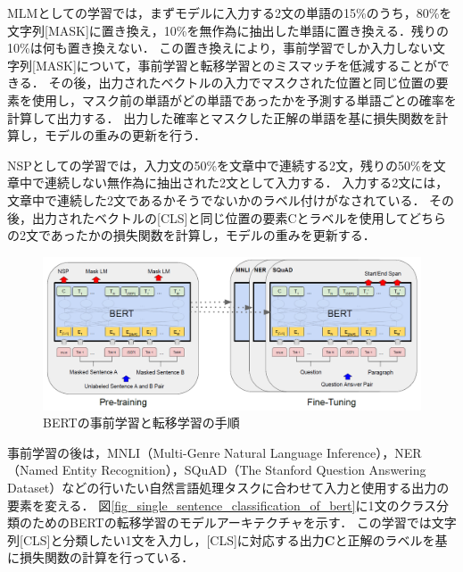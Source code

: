 \documentclass[12pt,a4j,dvipdfmx]{jreport}
\begin{document}
MLMとしての学習では，まずモデルに入力する2文の単語の15\%のうち，80\%を文字列[MASK]に置き換え，10\%を無作為に抽出した単語に置き換える．残りの10\%は何も置き換えない．
この置き換えにより，事前学習でしか入力しない文字列[MASK]について，事前学習と転移学習とのミスマッチを低減することができる．
その後，出力されたベクトルの入力でマスクされた位置と同じ位置の要素を使用し，マスク前の単語がどの単語であったかを予測する単語ごとの確率を計算して出力する．
出力した確率とマスクした正解の単語を基に損失関数を計算し，モデルの重みの更新を行う．

NSPとしての学習では，入力文の50\%を文章中で連続する2文，残りの50\%を文章中で連続しない無作為に抽出された2文として入力する．
入力する2文には，文章中で連続した2文であるかそうでないかのラベル付けがなされている．
その後，出力されたベクトルの[CLS]と同じ位置の要素Cとラベルを使用してどちらの2文であったかの損失関数を計算し，モデルの重みを更新する．

\begin{figure}[H]
	\centering
	\includegraphics[keepaspectratio, width=120mm]{img/fine-tuning-of-bert.png}
	\caption{BERTの事前学習と転移学習の手順\protect\footnotemark[5]}
	\label{fig_fine_tuning_of_bert}
\end{figure}

事前学習の後は，MNLI（Multi-Genre Natural Language Inference），NER（Named Entity Recognition），SQuAD（The Stanford Question Answering Dataset）などの行いたい自然言語処理タスクに合わせて入力と使用する出力の要素を変える．
図\ref{fig_single_sentence_classification_of_bert}に1文のクラス分類のためのBERTの転移学習のモデルアーキテクチャを示す．
この学習では文字列[CLS]と分類したい1文を入力し，[CLS]に対応する出力$\bm{C}$と正解のラベルを基に損失関数の計算を行っている．

\end{document}
